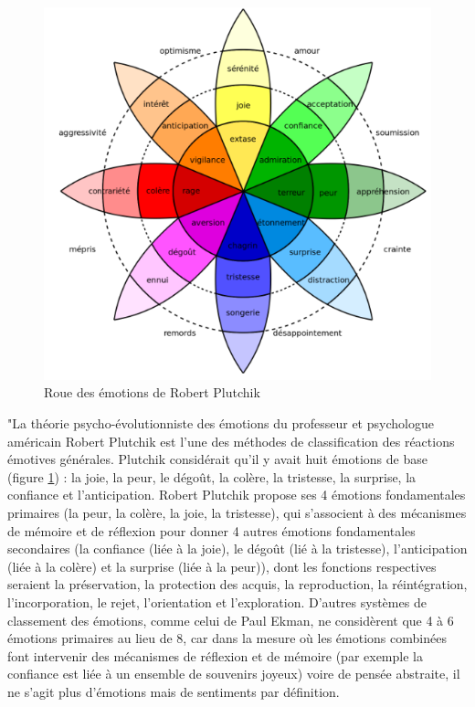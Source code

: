 \begin{figure}[th]
\centering
\includegraphics{Figures/emotions.PNG}
\decoRule
\caption[Roue des émotions de Robert Plutchik]{Roue des émotions de Robert Plutchik}
\label{fig:roue}
\end{figure}



 "La théorie psycho-évolutionniste des émotions du professeur et psychologue américain Robert Plutchik \parencite{plutchik} est l'une des méthodes de classification des réactions émotives générales. Plutchik considérait qu'il y avait huit émotions de base (figure \ref{fig:roue}) : la joie, la peur, le dégoût, la colère, la tristesse, la surprise, la confiance et l'anticipation. Robert Plutchik propose ses 4 émotions fondamentales primaires (la peur, la colère, la joie, la tristesse), qui s'associent à des mécanismes de mémoire et de réflexion pour donner 4 autres émotions fondamentales secondaires (la confiance (liée à la joie), le dégoût (lié à la tristesse), l'anticipation (liée à la colère) et la surprise (liée à la peur)), dont les fonctions respectives seraient la préservation, la protection des acquis, la reproduction, la réintégration, l'incorporation, le rejet, l'orientation et l'exploration. D'autres systèmes de classement des émotions, comme celui de Paul Ekman, ne considèrent que 4 à 6 émotions primaires au lieu de 8, car dans la mesure où les émotions combinées font intervenir des mécanismes de réflexion et de mémoire (par exemple la confiance est liée à un ensemble de souvenirs joyeux) voire de pensée abstraite, il ne s'agit plus d'émotions mais de sentiments par définition.

